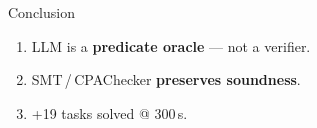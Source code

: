\begin{frame}{Conclusion}
  \vspace*{\fill}
  \begin{center}
  \large
  \begin{enumerate}
    \setlength\itemsep{0.8em}
    \item LLM is a \textbf{predicate oracle} --- not a verifier.
    \item SMT\,/\,CPAChecker \textbf{preserves soundness}.
    \item \alert{+19} tasks solved @ 300\,s.
  \end{enumerate}
  \end{center}
  \vspace*{\fill}
\end{frame}
